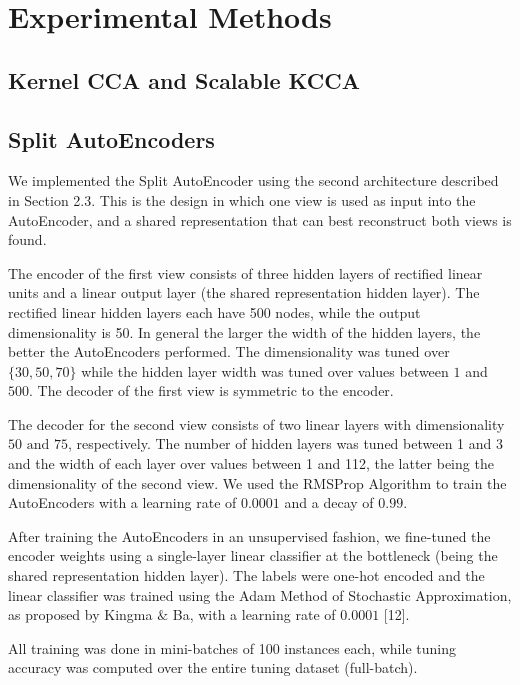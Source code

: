 \documentclass{article} %
\begin{document}
\section{Experimental Methods}

\subsection{Kernel CCA and Scalable KCCA}


\subsection{Split AutoEncoders}

We implemented the Split AutoEncoder using the second architecture described in Section 2.3. This is the design in which one view is used as input into the AutoEncoder, and a shared representation that can best reconstruct both views is found.

The encoder of the first view consists of three hidden layers of rectified linear units and a linear output layer (the shared representation hidden layer). The rectified linear hidden layers each have 500 nodes, while the output dimensionality is 50. In general the larger the width of the hidden layers, the better the AutoEncoders performed. The dimensionality was tuned over $\{30, 50, 70\}$ while the hidden layer width was tuned over values between $1$ and $500$. The decoder of the first view is symmetric to the encoder. 

The decoder for the second view consists of two linear layers with dimensionality $50 \text{ and } 75$, respectively. The number of hidden layers was tuned between 1 and 3 and the width of each layer over values between 1 and 112, the latter being the dimensionality of the second view. We used the RMSProp Algorithm to train the AutoEncoders with a learning rate of $0.0001$ and a decay of $0.99$. 

After training the AutoEncoders in an unsupervised fashion, we fine-tuned the encoder weights using a single-layer linear classifier at the bottleneck (being the shared representation hidden layer). The labels were one-hot encoded and the linear classifier was trained using the Adam Method of Stochastic Approximation, as proposed by Kingma $\&$ Ba, with a learning rate of $0.0001$ [12].

All training was done in mini-batches of 100 instances each, while tuning accuracy was computed over the entire tuning dataset (full-batch).
\end{document}
